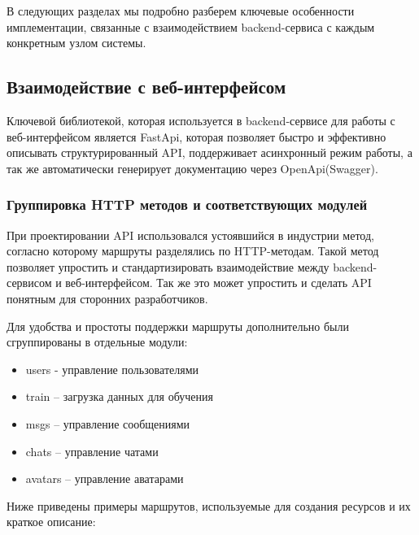 В следующих разделах мы подробно разберем ключевые особенности имплементации, связанные с взаимодействием backend-сервиса с каждым конкретным узлом системы.

\subsection{Взаимодействие с веб-интерфейсом}
Ключевой библиотекой, которая используется в backend-сервисе для работы с веб-интерфейсом является FastApi, которая позволяет быстро и эффективно описывать структурированный API, поддерживает асинхронный режим работы, а так же автоматически генерирует документацию через OpenApi(Swagger).

\subsubsection{Группировка HTTP методов и соответствующих модулей}
При проектировании API использовался устоявшийся в индустрии метод, согласно которому маршруты разделялись по HTTP-методам. Такой метод позволяет упростить и стандартизировать взаимодействие между backend-сервисом и веб-интерфейсом. Так же это может упростить и сделать API понятным для сторонних разработчиков.

Для удобства и простоты поддержки маршруты дополнительно были сгруппированы в отдельные модули:
\begin{itemize}
    \item users - управление пользователями
    \item train – загрузка данных для обучения
    \item msgs – управление сообщениями
    \item chats – управление чатами
    \item avatars – управление аватарами
\end{itemize}

Ниже приведены примеры маршрутов, используемые для создания ресурсов и их краткое описание:


